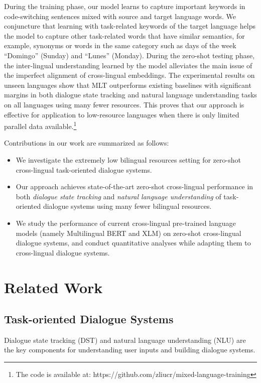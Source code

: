 \documentclass[letterpaper]{article}
\begin{document}
During the training phase, our model learns to capture important keywords in code-switching sentences mixed with source and target language words. We conjuncture that learning with task-related keywords of the target language helps the model to capture other task-related words that have similar semantics, for example, synonyms or words in the same category such as days of the week ``Domingo'' (Sunday) and ``Lunes'' (Monday). During the zero-shot testing phase, the inter-lingual understanding learned by the model alleviates the main issue of the imperfect alignment of cross-lingual embeddings. The experimental results on unseen languages show that MLT outperforms existing baselines with significant margins in both dialogue state tracking and natural language understanding tasks on all languages using many fewer resources. This proves that our approach is effective for application to low-resource languages when there is only limited parallel data available.\footnote{The code is available at: https://github.com/zliucr/mixed-language-training}

Contributions in our work are summarized as follows:
\begin{itemize}
    \item We investigate the extremely low bilingual resources setting for zero-shot cross-lingual task-oriented dialogue systems.
    \item Our approach achieves state-of-the-art zero-shot cross-lingual performance in both \textit{dialogue state tracking} and \textit{natural language understanding} of task-oriented dialogue systems using many fewer bilingual resources.
    \item We study the performance of current cross-lingual pre-trained language models (namely Multilingual BERT and XLM) on zero-shot cross-lingual dialogue systems, and conduct quantitative analyses while adapting them to cross-lingual dialogue systems.
\end{itemize}

\section{Related Work}
\subsection{Task-oriented Dialogue Systems}
Dialogue state tracking (DST) and natural language understanding (NLU) are the key components for understanding user inputs and building dialogue systems.
\end{document}
